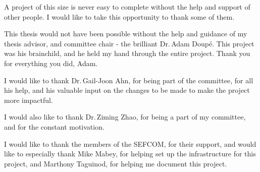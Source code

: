 A project of this size is never easy to complete without the help and support of other people. I would like to take this opportunity to thank some of them.

This thesis would not have been possible without the help and guidance of my thesis advisor, and committee chair - the brilliant Dr.\,Adam Doup\'{e}.
This project was his brainchild, and he held my hand through the entire project. Thank you for everything you did, Adam.

I would like to thank Dr.\,Gail-Joon Ahn, for being part of the committee, for all his help, and his valuable input on the changes to be made to make the project more impactful.

I would also like to thank Dr.\,Ziming Zhao, for being a part of my committee, and for the constant motivation.

I would like to thank the members of the SEFCOM, for their support, and would like to especially thank Mike Mabey, for helping set up the infrastructure for this project, and Marthony Taguinod, for helping me document this project.